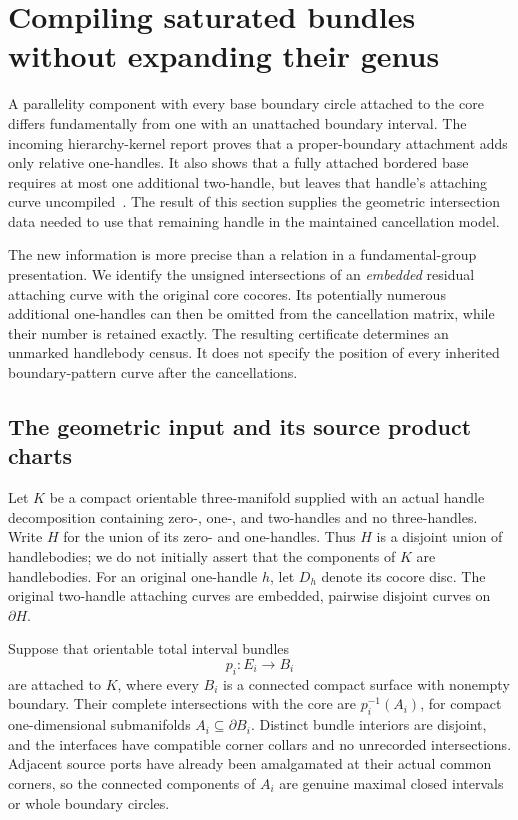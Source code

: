 \section{Compiling saturated bundles without expanding their genus}
\label{sec:relative-geometry}

A parallelity component with every base boundary circle attached to the core
differs fundamentally from one with an unattached boundary interval.  The
incoming hierarchy-kernel report proves that a proper-boundary attachment
adds only relative one-handles.  It also shows that a fully attached bordered
base requires at most one additional two-handle, but leaves that handle's
attaching curve uncompiled~\cite{incoming-hierarchy-kernels}.  The result of
this section supplies the geometric intersection data needed to use that
remaining handle in the maintained cancellation model.

The new information is more precise than a relation in a fundamental-group
presentation.  We identify the unsigned intersections of an \emph{embedded}
residual attaching curve with the original core cocores.  Its potentially
numerous additional one-handles can then be omitted from the cancellation
matrix, while their number is retained exactly.  The resulting certificate
determines an unmarked handlebody census.  It does not specify the position
of every inherited boundary-pattern curve after the cancellations.

\subsection{The geometric input and its source product charts}
\label{geom:input}

Let $K$ be a compact orientable three-manifold supplied with an actual
handle decomposition containing zero-, one-, and two-handles and no
three-handles.  Write $H$ for the union of its zero- and one-handles.
Thus $H$ is a disjoint union of handlebodies; we do not initially assert
that the components of $K$ are handlebodies.  For an original one-handle
$h$, let $D_h$ denote its cocore disc.  The original two-handle attaching
curves are embedded, pairwise disjoint curves on $\partial H$.

Suppose that orientable total interval bundles
\[
 p_i:E_i\longrightarrow B_i
\]
are attached to $K$, where every $B_i$ is a connected compact surface
with nonempty boundary.  Their complete intersections with the core are
$p_i^{-1}(A_i)$, for compact one-dimensional submanifolds
$A_i\subseteq\partial B_i$.  Distinct bundle interiors are disjoint,
and the interfaces have compatible corner collars and no unrecorded
intersections.  Adjacent source ports have already been amalgamated at
their actual common corners, so the connected components of $A_i$ are
genuine maximal closed intervals or whole boundary circles.

